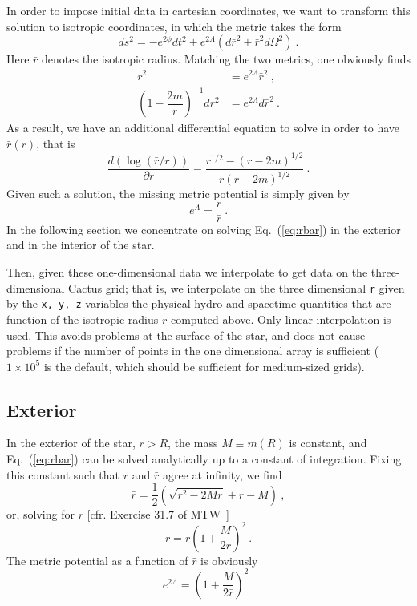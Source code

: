 In order to impose initial data in cartesian coordinates, we want to transform
this solution to isotropic coordinates, in which the metric takes the form
\begin{equation}
\label{eq:metr_iso}
ds^2 = -e^{2\phi}dt^2+e^{2\Lambda}\left(d\bar{r}^2+\bar{r}^2d\Omega^2\right) \ .
\end{equation}
Here $\bar{r}$ denotes the isotropic radius. Matching the two metrics, one
obviously finds
\begin{align}
r^2                                    &= e^{2\Lambda}\bar{r}^2 \ , \\
\left(1-\dfrac{2m}{r}\right)^{-1} dr^2 &= e^{2\Lambda}d\bar{r}^2 \ .
\end{align}
As a result, we have an additional differential equation to solve in order
to have $\bar{r}(r)$, that is
\begin{equation}
\label{eq:rbar}
\frac{d (\log(\bar{r} / r))}{\partial r} =  \frac{r^{1/2} - (r-2m)^{1/2}}{r(r-2m)^{1/2}} \ .
\end{equation}
Given such a solution, the missing metric potential is simply given by
\begin{equation}
e^{\Lambda} = \dfrac{r}{\bar{r}} \ .
\end{equation}
In the following section we concentrate on solving Eq.~(\ref{eq:rbar}) in the
exterior and in the interior of the star.

Then, given these one-dimensional data we interpolate to get data on 
the three-dimensional Cactus grid; that is, we interpolate on the three dimensional 
{\tt r} given by the {\tt x, y, z} variables the physical hydro and spacetime
quantities that are function of the isotropic radius $\bar{r}$ computed above. 
Only linear interpolation is used. This avoids problems at the surface of the 
star, and does not cause problems if the number of points in the one dimensional 
array is sufficient ($1\times 10^5$ is the default, which should be sufficient for 
medium-sized grids).

\subsection{Exterior}
\label{sbsc:exterior}

In the exterior of the star, $r>R$, the mass $M\equiv m(R)$ is constant, and 
Eq.~(\ref{eq:rbar}) can be solved analytically up to a constant of integration. 
Fixing this constant such that $r$ and $\bar{r}$ agree at infinity, we find
\begin{equation}
\bar{r} = \dfrac{1}{2}\left(\sqrt{r^2-2Mr}+r -M\right) \ ,
\end{equation}
or, solving for $r$ [cfr. Exercise 31.7 of MTW~\cite{mtw}]
\begin{equation}
r=\bar{r}\left(1+\dfrac{M}{2\bar{r}}\right)^2 \ .
\end{equation}
The metric potential as a function of $\bar{r}$ is obviously
\begin{equation}
e^{2\Lambda} = \left(1+\dfrac{M}{2\bar{r}}\right)^2 \ .
\end{equation}

